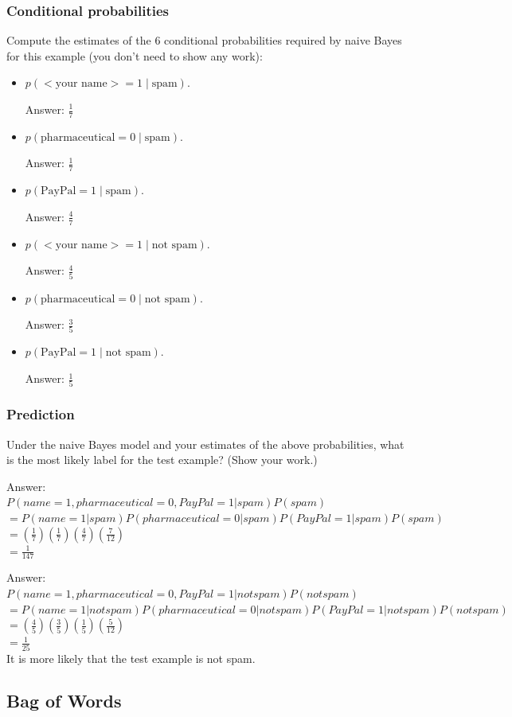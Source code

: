 \documentclass{article}
\def\ans#1{\par\gre{Answer: #1}}
\def\blu#1{{\color{blu}#1}}
\def\gre#1{{\color{gre}#1}}
\def\cond{\; | \;}
\def\items#1{\begin{itemize}#1\end{itemize}}
\begin{document}
\subsubsection{Conditional probabilities}

\blu{Compute the estimates of the 6 conditional probabilities required by naive Bayes for this example}  (you don't need to show any work):
\items{
\item $p(\text{$<$your name$>$} = 1  \cond \text{spam})$.
\ans{$\frac{1}{7}$}
\item $p(\text{pharmaceutical} = 0 \cond \text{spam})$.
\ans{$\frac{1}{7}$}
\item $p(\text{PayPal} = 1  \cond \text{spam})$.
\ans{$\frac{4}{7}$}
\item $p(\text{$<$your name$>$} = 1  \cond \text{not spam})$.
\ans{$\frac{4}{5}$}
\item $p(\text{pharmaceutical} = 0  \cond \text{not spam})$.
\ans{$\frac{3}{5}$}
\item $p(\text{PayPal} = 1  \cond \text{not spam})$.
\ans{$\frac{1}{5}$}
}

\subsubsection{Prediction}


\blu{Under the naive Bayes model and your estimates of the above probabilities, what is the most likely label for the test example? (Show your work.)}
\ans{\\
$P(name=1,pharmaceutical=0,PayPal=1|spam)P(spam)$ 
\\
$=P(name=1|spam)P(pharmaceutical=0|spam)P(PayPal=1|spam)P(spam)$
\\
$=(\frac{1}{7})(\frac{1}{7})(\frac{4}{7})(\frac{7}{12})$
\\
$=\frac{1}{147}$
}
\ans{\\
$P(name=1,pharmaceutical=0,PayPal=1|not spam)P(not spam)$ 
\\
$=P(name=1|not spam)P(pharmaceutical=0|not spam)P(PayPal=1|not spam)P(not spam)$
\\
$=(\frac{4}{5})(\frac{3}{5})(\frac{1}{5})(\frac{5}{12})$
\\
$=\frac{1}{25}$
\\
It is more likely that the test example is not spam.
}


\pagebreak

\subsection{Bag of Words}
\end{document}

